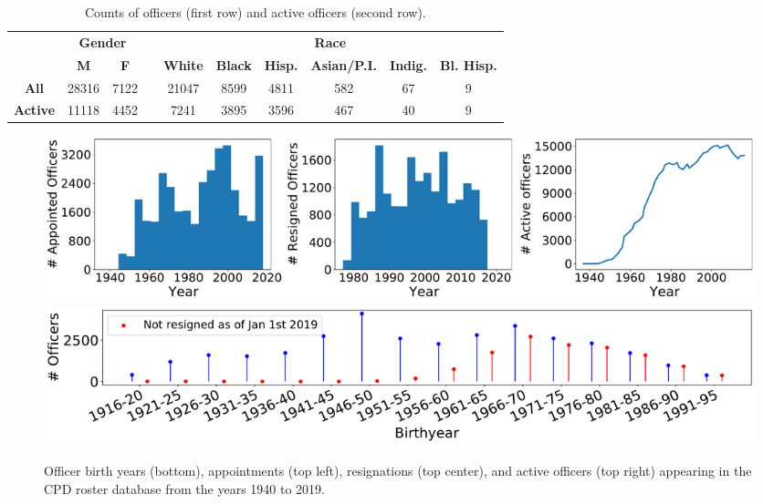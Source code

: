 \begin{table}[t!]
\caption{Counts of officers (first row) and active officers (second row).} \label{tab:stats}
\begin{tabular}{l|c|c|c|c|c|c|c|c|c|}
\cline{2-3} \cline{5-10}
                                               & \multicolumn{2}{c|}{\textbf{Gender}} & \multicolumn{1}{l|}{} & \multicolumn{6}{c|}{\textbf{Race}}                                                                                                                                                   \\ \cline{2-3} \cline{5-10} 
                                               & {\textbf{M}}   & {\textbf{F}}   &                       & {\textbf{White}} & {\textbf{Black}} & \multicolumn{1}{l|}{{\textbf{Hisp.}}} & {\textbf{Asian/P.I.}} & \multicolumn{1}{l|}{{\textbf{Indig.}}} & {\textbf{Bl. Hisp.}} \\ \cline{1-3} \cline{5-10} 
\multicolumn{1}{|c|}{\textbf{All}}    & 28316                 & 7122                  &                       & 21047                   & 8599                    & 4811                                         & 582                     & 67                                              & 9                           \\ \cline{1-3} \cline{5-10} 
\multicolumn{1}{|c|}{\textbf{Active}} & 11118                 & 4452                  &                       & 7241                    & 3895                    & 3596                                         & 467                     & 40                                              & 9                           \\ \cline{1-3} \cline{5-10} 
\end{tabular} 
\end{table}

\begin{figure}[t!] 
\includegraphics[width=\textwidth]{figs/history} 
\includegraphics[width=\textwidth]{figs/history_by} 
\caption{Officer birth years (bottom), appointments (top left), resignations (top center), and active
officers (top right) appearing in the CPD roster database from the years 1940 to 2019.}
\label{fig:history}
\end{figure}


